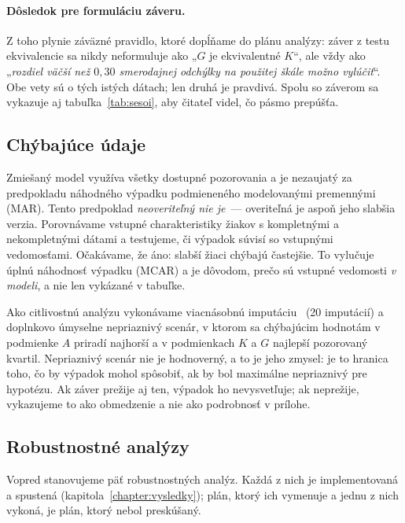 \paragraph{Dôsledok pre formuláciu záveru.} Z toho plynie záväzné pravidlo, ktoré dopĺňame do plánu analýzy: záver z testu ekvivalencie sa nikdy neformuluje ako „$G$ je ekvivalentné $K$“, ale vždy ako „\emph{rozdiel väčší než $0{,}30$ smerodajnej odchýlky na použitej škále možno vylúčiť}“. Obe vety sú o tých istých dátach; len druhá je pravdivá. Spolu so záverom sa vykazuje aj tabuľka~\ref{tab:sesoi}, aby čitateľ videl, čo pásmo prepúšťa.

\subsection{Chýbajúce údaje}
\label{subsec:chybajuce}

Zmiešaný model využíva všetky dostupné pozorovania a je nezaujatý za predpokladu náhodného výpadku podmieneného modelovanými premennými (MAR). Tento predpoklad \emph{neoveriteľný nie je}~--- overiteľná je aspoň jeho slabšia verzia. Porovnávame vstupné charakteristiky žiakov s kompletnými a nekompletnými dátami a testujeme, či výpadok súvisí so vstupnými vedomosťami. Očakávame, že áno: slabší žiaci chýbajú častejšie. To vylučuje úplnú náhodnosť výpadku (MCAR) a je dôvodom, prečo sú vstupné vedomosti \emph{v modeli}, a nie len vykázané v tabuľke.

Ako citlivostnú analýzu vykonávame viacnásobnú imputáciu~\cite{rubin1987imputation} (20 imputácií) a doplnkovo úmyselne nepriaznivý scenár, v ktorom sa chýbajúcim hodnotám v podmienke $A$ priradí najhorší a v podmienkach $K$ a $G$ najlepší pozorovaný kvartil. Nepriaznivý scenár nie je hodnoverný, a to je jeho zmysel: je to hranica toho, čo by výpadok mohol spôsobiť, ak by bol maximálne nepriaznivý pre hypotézu. Ak záver prežije aj ten, výpadok ho nevysvetľuje; ak neprežije, vykazujeme to ako obmedzenie a nie ako podrobnosť v prílohe.

\subsection{Robustnostné analýzy}

Vopred stanovujeme päť robustnostných analýz. Každá z nich je implementovaná a spustená (kapitola~\ref{chapter:vysledky}); plán, ktorý ich vymenuje a jednu z nich vykoná, je plán, ktorý nebol preskúšaný.

